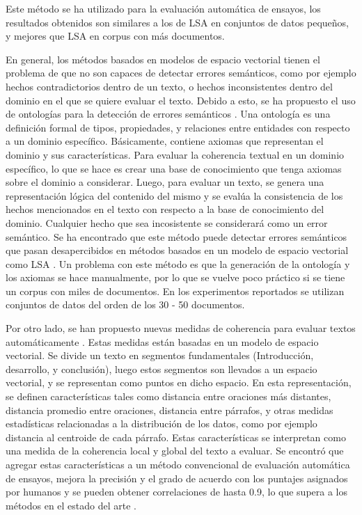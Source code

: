 \documentclass[12pt]{diicc}
\begin{document}
Este método se ha utilizado para la evaluación automática de ensayos, los resultados obtenidos son similares a los de LSA en conjuntos de datos pequeños, y mejores que LSA en corpus con más documentos.

En general, los métodos basados en modelos de espacio vectorial tienen el problema de que no son capaces de detectar errores semánticos, como por ejemplo hechos contradictorios dentro de un texto, o hechos inconsistentes dentro del dominio en el que se quiere evaluar el texto. Debido a esto, se ha propuesto el uso de ontologías para la detección de errores semánticos \cite{t43}. Una ontología es una definición formal de tipos, propiedades, y relaciones entre entidades con respecto a un dominio específico. Básicamente, contiene axiomas que representan el dominio y sus características. Para evaluar la coherencia textual en un dominio específico, lo que se hace es crear una base de conocimiento que tenga axiomas sobre el dominio a considerar. Luego, para evaluar un texto, se genera una representación lógica del contenido del mismo y se evalúa la consistencia de los hechos mencionados en el texto con respecto a la base de conocimiento del dominio. Cualquier hecho que sea incosistente se considerará como un error semántico. Se ha encontrado que este método puede detectar errores semánticos que pasan desapercibidos en métodos basados en un modelo de espacio vectorial como LSA \cite{t44}. Un problema con este método es que la generación de la ontología y los axiomas se hace manualmente, por lo que se vuelve poco práctico si se tiene un corpus con miles de documentos. En los experimentos reportados se utilizan conjuntos de datos del orden de los 30 - 50 documentos.

Por otro lado, se han propuesto nuevas medidas de coherencia para evaluar textos automáticamente \cite{t40}. Estas medidas están basadas en un modelo de espacio vectorial. Se divide un texto en segmentos fundamentales (Introducción, desarrollo, y conclusión), luego estos segmentos son llevados a un espacio vectorial, y se representan como puntos en dicho espacio. En esta representación, se definen características tales como distancia entre oraciones más distantes, distancia promedio entre oraciones, distancia entre párrafos, y otras medidas estadísticas relacionadas a la distribución de los datos, como por ejemplo distancia al centroide de cada párrafo. Estas características se interpretan como una medida de la coherencia local y global del texto a evaluar. Se encontró que agregar estas características a un método convencional de evaluación automática de ensayos, mejora la precisión y el grado de acuerdo con los puntajes asignados por humanos y se pueden obtener correlaciones de hasta 0.9, lo que supera a los métodos en el estado del arte \cite{t40}.
\end{document}
